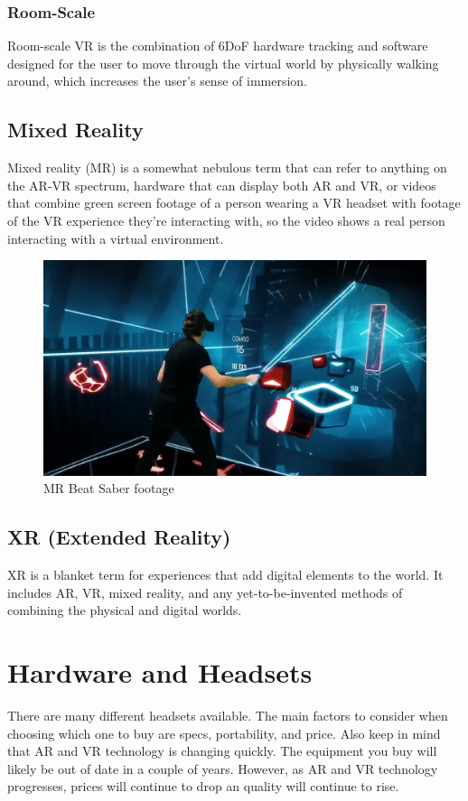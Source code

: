 \documentclass{article}
\begin{document}
\subsubsection{Room-Scale} Room-scale VR is the combination of 6DoF hardware tracking and software designed for the user to move through the virtual world by physically walking around, which increases the user's sense of immersion.

\subsection{Mixed Reality}

Mixed reality (MR) is a somewhat nebulous term that can refer to anything on the AR-VR spectrum, hardware that can display both AR and VR, or videos that combine green screen footage of a person wearing a VR headset with footage of the VR experience they're interacting with, so the video shows a real person interacting with a virtual environment.

\begin{figure}
\centering
\includegraphics[width=.6\textwidth]{beatsaber}
\caption{MR Beat Saber footage}
\end{figure}

\subsection{XR (Extended Reality)}
XR is a blanket term for experiences that add digital elements to the world. It includes AR, VR, mixed reality, and any yet-to-be-invented methods of combining the physical and digital worlds.

\section{Hardware and Headsets}
There are many different headsets available. The main factors to consider when choosing which one to buy are specs, portability, and price. Also keep in mind that AR and VR technology is changing quickly. The equipment you buy will likely be out of date in a couple of years. However, as AR and VR technology progresses, prices will continue to drop an quality will continue to rise.
\end{document}
